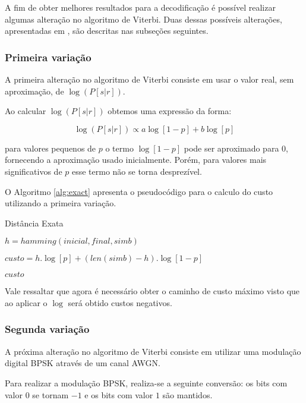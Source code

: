A fim de obter melhores resultados para a decodificação é possível realizar algumas alteração no algoritmo de Viterbi. Duas dessas possíveis alterações, apresentadas em \cite{ref:roteiro_lab4}, são descritas nas subseções seguintes.

\subsubsection{Primeira variação}

A primeira alteração no algoritmo de Viterbi consiste em usar o valor real, sem aproximação, de $\log(P[s|r])$. 

Ao calcular $\log(P[s|r])$ obtemos uma expressão da forma:

\begin{equation}
	\log(P[s|r]) \propto a\log[1-p] + b\log[p]
\end{equation}

para valores pequenos de $p$ o termo $\log[1-p]$ pode ser aproximado para $0$, fornecendo a aproximação usado inicialmente. Porém, para valores mais significativos de $p$ esse termo não se torna desprezível.

O Algoritmo \ref{alg:exact} apresenta o pseudocódigo para o calculo do custo utilizando a primeira variação.

\begin{algorithm}[h!]
	\caption{Distância Exata}
	\label{alg:exact}
	\begin{algorithmic}		
		\State $h = hamming(inicial, final, simb)$
		
		\State $custo = h.\log[p] + (len(simb) - h).\log[1-p]$
			
		\Return $custo$
		\EndProcedure
	\end{algorithmic}
\end{algorithm}

Vale ressaltar que agora é necessário obter o caminho de custo máximo visto que ao aplicar o $\log$ será obtido custos negativos. 

\subsubsection{Segunda variação}

A próxima alteração no algoritmo de Viterbi consiste em utilizar uma modulação digital BPSK através de um canal AWGN. 

Para realizar a modulação BPSK, realiza-se a seguinte conversão: os bits com valor $0$ se tornam $-1$ e os bits com valor $1$ são mantidos.


